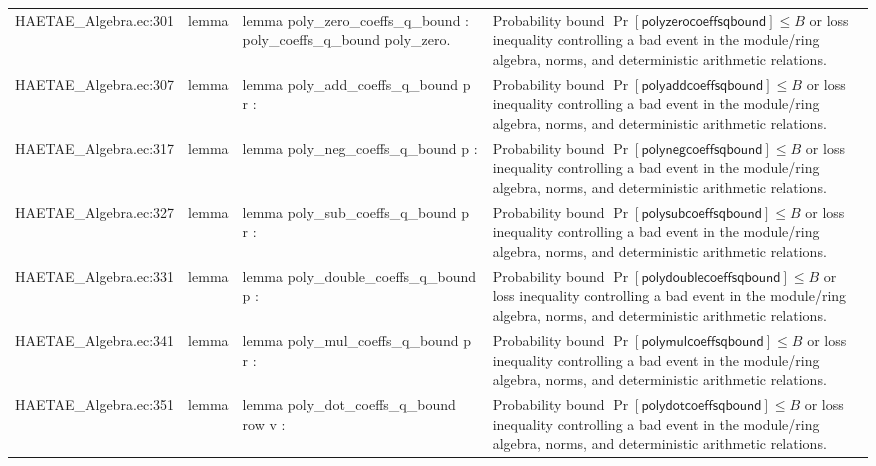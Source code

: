 \documentclass[10pt]{article}
\begin{document}
\begin{longtable}{L{0.11\textwidth}L{0.055\textwidth}L{0.385\textwidth}L{0.41\textwidth}}
HAETAE\_\allowbreak{}Algebra.\allowbreak{}ec:\allowbreak{}301 & lemma & {\ttfamily\scriptsize lemma poly\_\allowbreak{}zero\_\allowbreak{}coeffs\_\allowbreak{}q\_\allowbreak{}bound : poly\_\allowbreak{}coeffs\_\allowbreak{}q\_\allowbreak{}bound poly\_\allowbreak{}zero.} & Probability bound $\Pr[\mathsf{polyzerocoeffsqbound}]\le B$ or loss inequality controlling a bad event in the module/ring algebra, norms, and deterministic arithmetic relations. \\
HAETAE\_\allowbreak{}Algebra.\allowbreak{}ec:\allowbreak{}307 & lemma & {\ttfamily\scriptsize lemma poly\_\allowbreak{}add\_\allowbreak{}coeffs\_\allowbreak{}q\_\allowbreak{}bound p r :} & Probability bound $\Pr[\mathsf{polyaddcoeffsqbound}]\le B$ or loss inequality controlling a bad event in the module/ring algebra, norms, and deterministic arithmetic relations. \\
HAETAE\_\allowbreak{}Algebra.\allowbreak{}ec:\allowbreak{}317 & lemma & {\ttfamily\scriptsize lemma poly\_\allowbreak{}neg\_\allowbreak{}coeffs\_\allowbreak{}q\_\allowbreak{}bound p :} & Probability bound $\Pr[\mathsf{polynegcoeffsqbound}]\le B$ or loss inequality controlling a bad event in the module/ring algebra, norms, and deterministic arithmetic relations. \\
HAETAE\_\allowbreak{}Algebra.\allowbreak{}ec:\allowbreak{}327 & lemma & {\ttfamily\scriptsize lemma poly\_\allowbreak{}sub\_\allowbreak{}coeffs\_\allowbreak{}q\_\allowbreak{}bound p r :} & Probability bound $\Pr[\mathsf{polysubcoeffsqbound}]\le B$ or loss inequality controlling a bad event in the module/ring algebra, norms, and deterministic arithmetic relations. \\
HAETAE\_\allowbreak{}Algebra.\allowbreak{}ec:\allowbreak{}331 & lemma & {\ttfamily\scriptsize lemma poly\_\allowbreak{}double\_\allowbreak{}coeffs\_\allowbreak{}q\_\allowbreak{}bound p :} & Probability bound $\Pr[\mathsf{polydoublecoeffsqbound}]\le B$ or loss inequality controlling a bad event in the module/ring algebra, norms, and deterministic arithmetic relations. \\
HAETAE\_\allowbreak{}Algebra.\allowbreak{}ec:\allowbreak{}341 & lemma & {\ttfamily\scriptsize lemma poly\_\allowbreak{}mul\_\allowbreak{}coeffs\_\allowbreak{}q\_\allowbreak{}bound p r :} & Probability bound $\Pr[\mathsf{polymulcoeffsqbound}]\le B$ or loss inequality controlling a bad event in the module/ring algebra, norms, and deterministic arithmetic relations. \\
HAETAE\_\allowbreak{}Algebra.\allowbreak{}ec:\allowbreak{}351 & lemma & {\ttfamily\scriptsize lemma poly\_\allowbreak{}dot\_\allowbreak{}coeffs\_\allowbreak{}q\_\allowbreak{}bound row v :} & Probability bound $\Pr[\mathsf{polydotcoeffsqbound}]\le B$ or loss inequality controlling a bad event in the module/ring algebra, norms, and deterministic arithmetic relations. \\

\end{longtable}
\end{document}
